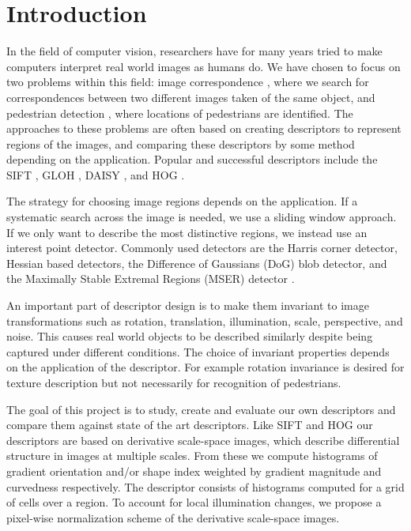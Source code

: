 \documentclass[thesis.tex]{subfiles}
\begin{document}
\section{Introduction}
\label{sec:introduction}

In the field of computer vision, researchers have for many years tried to make computers interpret real world images as humans do. We have chosen to focus on two problems within this field: image correspondence \cite{dahl2011finding}, where we search for correspondences between two different images taken of the same object, and pedestrian detection \cite{felzenszwalb2008discriminatively}, where locations of pedestrians are identified. The approaches to these problems are often based on creating descriptors to represent regions of the images, and comparing these descriptors by some method depending on the application. Popular and successful descriptors include the SIFT \cite{lowe2004distinctive}, GLOH \cite{mikolajczyk2005performance}, DAISY \cite{tola2008fast}, and HOG \cite{dalal2005histograms,felzenszwalb2009object}.

The strategy for choosing image regions depends on the application. If a systematic search across the image is needed, we use a sliding window approach. If we only want to describe the most distinctive regions, we instead use an interest point detector. Commonly used detectors are the Harris corner detector, Hessian based detectors, the Difference of Gaussians (DoG) blob detector, and the Maximally Stable Extremal Regions (MSER) detector \cite{aanaes2012interesting,dahl2011finding}.

An important part of descriptor design is to make them invariant to image transformations such as rotation, translation, illumination, scale, perspective, and noise. This causes real world objects to be described similarly despite being captured under different conditions. The choice of invariant properties depends on the application of the descriptor. For example rotation invariance is desired for texture description but not necessarily for recognition of pedestrians.

The goal of this project is to study, create and evaluate our own descriptors and compare them against state of the art descriptors. Like SIFT and HOG our descriptors are based on derivative scale-space images, which describe differential structure in images at multiple scales. From these we compute histograms of gradient orientation and/or shape index weighted by gradient magnitude and curvedness respectively. The descriptor consists of histograms computed for a grid of cells over a region. To account for local illumination changes, we propose a pixel-wise normalization scheme of the derivative scale-space images.
\end{document}
